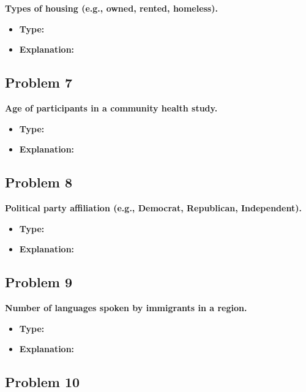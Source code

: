 \documentclass[
  letterpaper,
  DIV=11,
  numbers=noendperiod]{scrreprt}
\begin{document}
\textbf{Types of housing (e.g., owned, rented, homeless).}

\begin{itemize}
\item
  \textbf{Type:}
\item
  \textbf{Explanation:}
\end{itemize}

\subsection*{Problem 7}\label{problem-7}

\textbf{Age of participants in a community health study.}

\begin{itemize}
\item
  \textbf{Type:}
\item
  \textbf{Explanation:}
\end{itemize}

\subsection*{Problem 8}\label{problem-8}

\textbf{Political party affiliation (e.g., Democrat, Republican,
Independent).}

\begin{itemize}
\item
  \textbf{Type:}
\item
  \textbf{Explanation:}
\end{itemize}

\subsection*{Problem 9}\label{problem-9}

\textbf{Number of languages spoken by immigrants in a region.}

\begin{itemize}
\item
  \textbf{Type:}
\item
  \textbf{Explanation:}
\end{itemize}

\subsection*{Problem 10}\label{problem-10}
\end{document}
